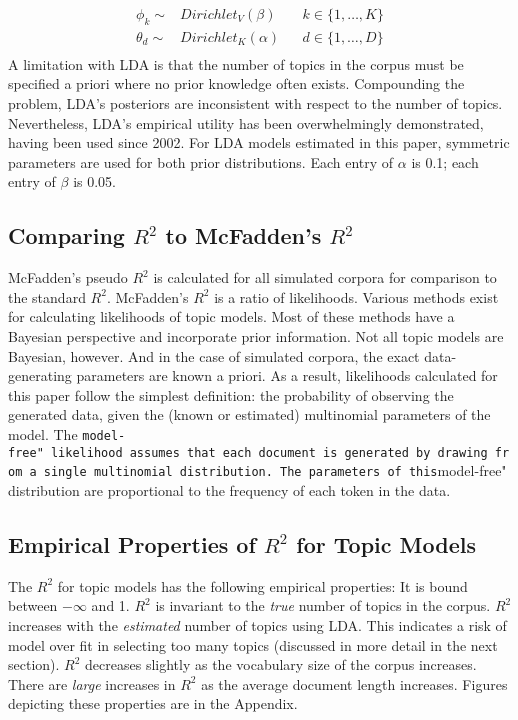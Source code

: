 \documentclass[conference,final,]{IEEEtran}
\begin{document}
\begin{align*}
\phi_k \sim& Dirichlet_V(\beta) && k\in\{1, \ldots, K\} \\
{\theta}_d \sim& Dirichlet_K({\alpha}) && d\in\{1, \ldots, D\}\\
\end{align*} A limitation with LDA is that the number of topics in the
corpus must be specified a priori where no prior knowledge often exists.
Compounding the problem, LDA's posteriors are inconsistent with respect
to the number of topics. \cite{womack13} Nevertheless, LDA's empirical
utility has been overwhelmingly demonstrated, having been used since
2002. For LDA models estimated in this paper, symmetric parameters are
used for both prior distributions. Each entry of \(\alpha\) is 0.1; each
entry of \(\beta\) is 0.05.

\subsection{Comparing $R^2$ to McFadden's $R^2$}

McFadden's pseudo \(R^2\) is calculated for all simulated corpora for
comparison to the standard \(R^2\). McFadden's \(R^2\) is a ratio of
likelihoods. Various methods exist for calculating likelihoods of topic
models. \cite{buntine09} Most of these methods have a Bayesian
perspective and incorporate prior information. Not all topic models are
Bayesian, however. And in the case of simulated corpora, the exact
data-generating parameters are known a priori. As a result, likelihoods
calculated for this paper follow the simplest definition: the
probability of observing the generated data, given the (known or
estimated) multinomial parameters of the model. The
\texttt{model-free"\ likelihood\ assumes\ that\ each\ document\ is\ generated\ by\ drawing\ from\ a\ single\ multinomial\ distribution.\ The\ parameters\ of\ this}model-free"
distribution are proportional to the frequency of each token in the
data.

\subsection{Empirical Properties of $R^2$ for Topic Models}

The \(R^2\) for topic models has the following empirical properties: It
is bound between \(-\infty\) and 1. \(R^2\) is invariant to the
\textit{true} number of topics in the corpus. \(R^2\) increases with the
\textit{estimated} number of topics using LDA. This indicates a risk of
model over fit in selecting too many topics (discussed in more detail in
the next section). \(R^2\) decreases slightly as the vocabulary size of
the corpus increases. There are \textit{large} increases in \(R^2\) as
the average document length increases. Figures depicting these
properties are in the Appendix.
\end{document}
